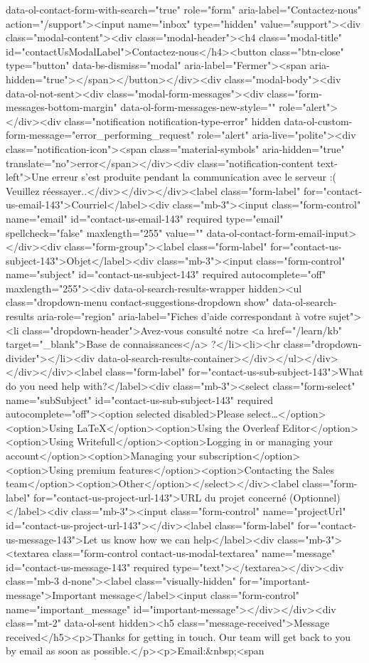 data-ol-contact-form-with-search="true" role="form" aria-label="Contactez-nous" action="/support"><input name="inbox" type="hidden" value="support"><div class="modal-content"><div class="modal-header"><h4 class="modal-title" id="contactUsModalLabel">Contactez-nous</h4><button class="btn-close" type="button" data-bs-dismiss="modal" aria-label="Fermer"><span aria-hidden="true"></span></button></div><div class="modal-body"><div data-ol-not-sent><div class="modal-form-messages"><div class="form-messages-bottom-margin" data-ol-form-messages-new-style="" role="alert"></div><div class="notification notification-type-error" hidden data-ol-custom-form-message="error_performing_request" role="alert" aria-live="polite"><div class="notification-icon"><span class="material-symbols" aria-hidden="true" translate="no">error</span></div><div class="notification-content text-left">Une erreur s’est produite pendant la communication avec le serveur :( Veuillez réessayer..</div></div></div><label class="form-label" for="contact-us-email-143">Courriel</label><div class="mb-3"><input class="form-control" name="email" id="contact-us-email-143" required type="email" spellcheck="false" maxlength="255" value="" data-ol-contact-form-email-input></div><div class="form-group"><label class="form-label" for="contact-us-subject-143">Objet</label><div class="mb-3"><input class="form-control" name="subject" id="contact-us-subject-143" required autocomplete="off" maxlength="255"><div data-ol-search-results-wrapper hidden><ul class="dropdown-menu contact-suggestions-dropdown show" data-ol-search-results aria-role="region" aria-label="Fiches d’aide correspondant à votre sujet"><li class="dropdown-header">Avez-vous consulté notre <a href="/learn/kb" target="_blank">Base de connaissances</a> ?</li><li><hr class="dropdown-divider"></li><div data-ol-search-results-container></div></ul></div></div></div><label class="form-label" for="contact-us-sub-subject-143">What do you need help with?</label><div class="mb-3"><select class="form-select" name="subSubject" id="contact-us-sub-subject-143" required autocomplete="off"><option selected disabled>Please select…</option><option>Using LaTeX</option><option>Using the Overleaf Editor</option><option>Using Writefull</option><option>Logging in or managing your account</option><option>Managing your subscription</option><option>Using premium features</option><option>Contacting the Sales team</option><option>Other</option></select></div><label class="form-label" for="contact-us-project-url-143">URL du projet concerné (Optionnel)</label><div class="mb-3"><input class="form-control" name="projectUrl" id="contact-us-project-url-143"></div><label class="form-label" for="contact-us-message-143">Let us know how we can help</label><div class="mb-3"><textarea class="form-control contact-us-modal-textarea" name="message" id="contact-us-message-143" required type="text"></textarea></div><div class="mb-3 d-none"><label class="visually-hidden" for="important-message">Important message</label><input class="form-control" name="important_message" id="important-message"></div></div><div class="mt-2" data-ol-sent hidden><h5 class="message-received">Message received</h5><p>Thanks for getting in touch. Our team will get back to you by email as soon as possible.</p><p>Email:&nbsp;<span 